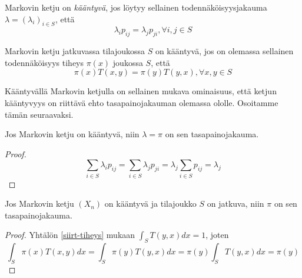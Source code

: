 \begin{maar}\label{kaant-disk}
	Markovin ketju on \textit{kääntyvä}, jos löytyy sellainen todennäköisyysjakauma $\lambda=(\lambda_i)_{i\in S}$, että 
	\begin{equation}
		\lambda_ip_{ij}= \lambda_jp_{ji},\forall i,j\in S
	\end{equation}
\end{maar}

\begin{maar}\label{kaant-jatk}
	Markovin ketju jatkuvassa tilajoukossa $S$ on kääntyvä, jos on olemassa sellainen todennäköisyys tiheys $\pi(x)$ joukossa $S$, että
	\begin{equation}
		\pi(x)T(x,y)=\pi(y)T(y,x), \forall x,y\in S
	\end{equation}
\end{maar}

Kääntyvällä Markovin ketjulla on sellainen mukava ominaisuus, että ketjun kääntyvyys on riittävä ehto tasapainojakauman olemassa ololle. Osoitamme tämän seuraavaksi.

\begin{lause}
	Jos Markovin ketju on kääntyvä, niin $\lambda=\pi$ on sen tasapainojakauma.
\end{lause}
\begin{proof}
	\begin{equation*}
		\sum_{i\in S} \lambda_i p_{ij} = \sum_{i\in S} \lambda_j p_{ji} = \lambda_j \sum_{i\in S} p_{ij} = \lambda_j
	\end{equation*}
\end{proof}

\begin{lause}
	Jos Markovin ketju $(X_n)$ on kääntyvä ja tilajoukko $S$ on jatkuva, niin $\pi$ on sen tasapainojakauma.
\end{lause}

\begin{proof}
	Yhtälön \ref{siirt-tiheys} mukaan $\int_S T(y,x)dx = 1$, joten
	\begin{equation}
		\int_S \pi(x) T(x,y) dx = \int_S \pi(y) T(y,x) dx = \pi(y)\int_S T(y,x) dx = \pi(y)
	\end{equation}
\end{proof}

